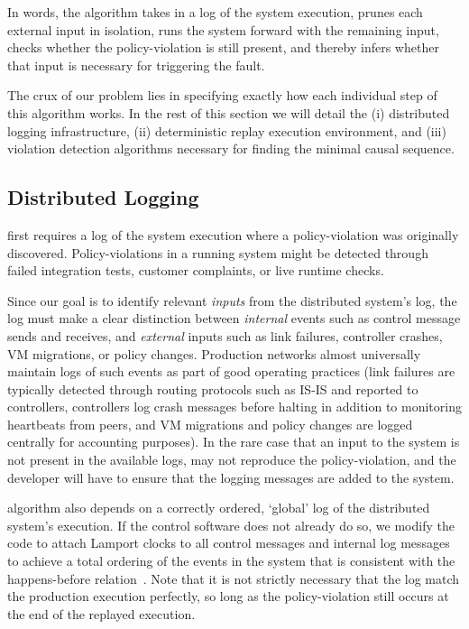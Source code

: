 \noindent In words, the algorithm takes in a log of the system execution,
prunes each external input in isolation,
runs the system forward with the remaining input, checks whether the
policy-violation is still present, and thereby infers whether that input is
necessary for triggering the fault.

The crux of our problem lies in specifying exactly how each
individual step of this algorithm works. In the rest of this section we will
detail the (i) distributed logging infrastructure, (ii) deterministic
replay execution environment, and (iii) violation detection algorithms
necessary for finding the minimal causal sequence.

\subsection{Distributed Logging}

\Simulator{} first requires a log of the system execution where a
policy-violation was originally discovered. Policy-violations
in a running system might be detected through failed integration tests,
customer complaints, or live runtime checks.

Since our goal is to identify
relevant {\em inputs} from the distributed system's log, the log must make a clear
distinction between {\em internal} events such as control message sends and
receives, and {\em external} inputs such as
link failures, controller crashes, VM migrations, or policy changes.
Production networks almost universally maintain logs of such events as part of
good operating practices (link failures are typically detected through
routing protocols such as IS-IS and reported to controllers,
controllers log crash messages before
halting in addition to monitoring heartbeats from peers, and VM migrations and
policy changes are logged centrally for accounting purposes). In the rare case
that an input to the system is not present in the available logs,
\simulator{} may not reproduce the policy-violation, and the developer will
have to ensure that the logging messages are added to the system.

\Simulator{} algorithm also depends on a correctly ordered, `global' log of the
distributed system's execution. If the control software does not already do
so, we modify the code to attach Lamport
clocks to all
control messages and internal log messages
to achieve a total ordering of the events in the system that
is consistent with the happens-before
relation~\cite{Lamport:1978:TCO:359545.359563}. Note that it is not
strictly necessary that the log match the production execution perfectly, so
long as the policy-violation still occurs at the end of the replayed
execution.

